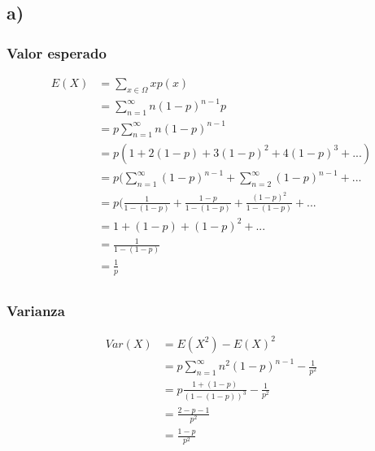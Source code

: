 \documentclass{article}
\begin{document}
\begin{tcolorbox}[breakable]
    \subsection*{a)}
    \subsubsection*{Valor esperado}
    \begin{align*}
        E(X) 
        &= \sum_{x \in \Omega} xp(x) \\
        &= \sum_{n=1}^\infty n(1-p)^{n-1}p \\
        &= p\sum_{n=1}^\infty n(1-p)^{n-1} \\ 
        &= p(1+2(1-p)+3(1-p)^2+4(1-p)^3+...) \\
        &= p(\sum_{n=1}^\infty (1-p)^{n-1} + \sum_{n=2}^\infty (1-p)^{n-1} + ... \\
        &= p(\tfrac{1}{1-(1-p)} + \tfrac{1-p}{1-(1-p)} + \tfrac{(1-p)^2}{1-(1-p)} +... \\
        &= 1+(1-p)+(1-p)^2+... \\
        &= \frac{1}{1-(1-p)} \\
        &= \frac{1}{p} \\
    \end{align*}
    \subsubsection*{Varianza}
    \begin{align*}
        Var(X) 
        &= E(X^2)-E(X)^2 \\
        &= p\sum_{n=1}^\infty n^2(1-p)^{n-1} - \frac{1}{p^2} \\
        &= p\frac{1+(1-p)}{(1-(1-p))^3} - \frac{1}{p^2} \\
        &= \frac{2-p-1}{p^2} \\
        &= \frac{1-p}{p^2}
    \end{align*}

\end{tcolorbox}
\end{document}
